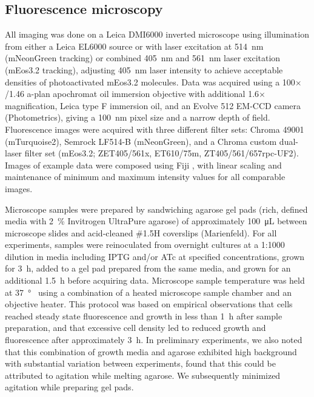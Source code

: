 \documentclass[pdflatex,sn-nature]{sn-jnl}%
\begin{document}
\subsection{Fluorescence microscopy}

All imaging was done on a Leica DMI6000 inverted microscope using illumination from either a Leica EL6000 source or with laser excitation at \qty{514}{\nm} (mNeonGreen tracking) or combined \qty{405}{\nm} and \qty{561}{\nm} laser excitation (mEos3.2 tracking), adjusting \qty{405}{\nm} laser intensity to achieve acceptable densities of photoactivated mEos3.2 molecules.
Data was acquired using a 100$\times$/1.46 a-plan apochromat oil immersion objective with additional 1.6$\times$ magnification, Leica type F immersion oil, and an Evolve 512 EM-CCD camera (Photometrics), giving a \qty{100}{\nm} pixel size and a narrow depth of field.
Fluorescence images were acquired with three different filter sets: Chroma 49001 (mTurquoise2), Semrock LF514-B (mNeonGreen), and a Chroma custom dual-laser filter set (mEos3.2; ZET405/561x, ET610/75m, ZT405/561/657rpc-UF2).
Images of example data were composed using Fiji \citep{schindelinFijiOpensourcePlatform2012}, with linear scaling and maintenance of minimum and maximum intensity values for all comparable images.

Microscope samples were prepared by sandwiching agarose gel pads (rich, defined media with \qty{2}{\percent} Invitrogen UltraPure agarose) of approximately \qty{100}{\uL} between microscope slides and acid-cleaned \#1.5H coverslips (Marienfeld).
For all experiments, samples were reinoculated from overnight cultures at a 1:1000 dilution in media including IPTG and/or ATc at specified concentrations, grown for \qty{3}{\hour}, added to a gel pad prepared from the same media, and grown for an additional \qty{1.5}{\hour} before acquiring data.
Microscope sample temperature was held at \qty{37}{\degree\C} using a combination of a heated microscope sample chamber and an objective heater.
This protocol was based on empirical observations that cells reached steady state fluorescence and growth in less than \qty{1}{\hour} after sample preparation, and that excessive cell density led to reduced growth and fluorescence after approximately \qty{3}{\hour}.
In preliminary experiments, we also noted that this combination of growth media and agarose exhibited high background with substantial variation between experiments, found that this could be attributed to agitation while melting agarose.
We subsequently minimized agitation while preparing gel pads.
\end{document}
